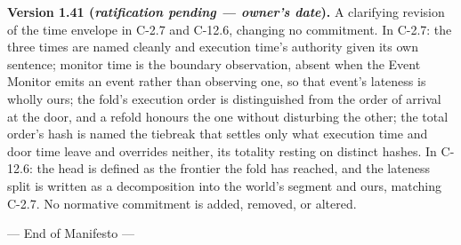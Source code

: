 \documentclass[11pt,a4paper]{article}
\begin{document}
\textbf{Version 1.41 (\emph{ratification pending --- owner's date}).}
A clarifying revision of the time envelope in C-2.7 and C-12.6,
changing no commitment. In C-2.7: the three times are named cleanly and
execution time's authority given its own sentence; monitor time is the
boundary observation, absent when the Event Monitor emits an event
rather than observing one, so that event's lateness is wholly ours; the
fold's execution order is distinguished from the order of arrival at
the door, and a refold honours the one without disturbing the other;
the total order's hash is named the tiebreak that settles only what
execution time and door time leave and overrides neither, its totality
resting on distinct hashes. In C-12.6: the head is defined as the
frontier the fold has reached, and the lateness split is written as a
decomposition into the world's segment and ours, matching C-2.7. No
normative commitment is added, removed, or altered.

--- End of Manifesto ---
\end{document}

